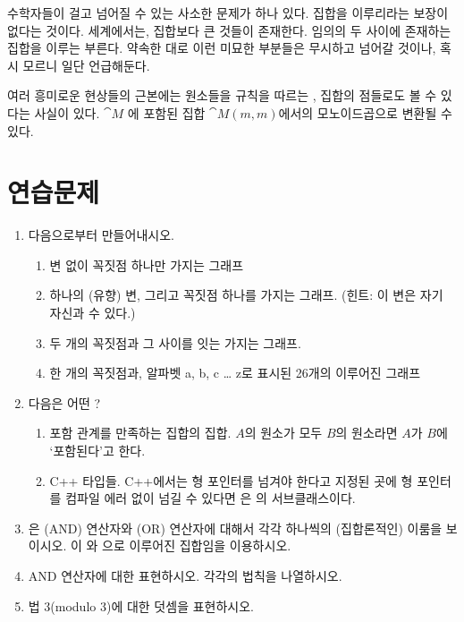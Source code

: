 \noindent
수학자들이 걸고 넘어질 수 있는 사소한 문제가 하나 있다.  집합을 이루리라는 보장이 없다는 것이다.
 세계에서는, 집합보다 큰 것들이 존재한다. 임의의 두 \trObject 사이에 존재하는 \trMorphism\이 집합을 이루는 \trCategory\는  부른다.
약속한 대로 이런 미묘한 부분들은 무시하고 넘어갈 것이나, 혹시 모르니 일단 언급해둔다.

 여러 흥미로운 현상들의 근본에는  원소들을  규칙을 따르는 \trMorphism{}, 집합의 점들로도 볼 수 있다는 사실이 있다.
$\cat{M}$ 에 포함된  \trComposition\은 집합 $\cat{M}(m, m)$에서의 모노이드곱으로 변환될 수 있다.

\section{연습문제}

\begin{enumerate}
\tightlist
\item
  다음으로부터 \trFreeCategory\를 만들어내시오.  

  \begin{enumerate}
  \tightlist
  \item
    변 없이 꼭짓점 하나만 가지는 그래프
  \item
    하나의 (유향) 변, 그리고 꼭짓점 하나를 가지는 그래프.
    (힌트: 이 변은 자기 자신과  수 있다.)
  \item
    두 개의 꼭짓점과 그 사이를 잇는 \trArrow\를 가지는 그래프.
  \item
    한 개의 꼭짓점과, 알파벳 a, b, c \ldots{} z로 표시된 26개의 \trArrow\로 이루어진 그래프
  \end{enumerate}
\item
  다음은 어떤 ?

  \begin{enumerate}
  \tightlist
  \item
    포함 관계를 만족하는 집합의 집합. $A$의 원소가 모두 $B$의 원소라면 $A$가 $B$에 `포함된다'고 한다. %
  \item
    C++ 타입들. C++에서는 형 포인터를 넘겨야 한다고 지정된 곳에 형 포인터를 컴파일 에러 없이 넘길 수 있다면 
    은 의 서브클래스이다.
  \end{enumerate}
\item
  은 \code{\&\&} (AND) 연산자와 \code{||} (OR) 연산자에 대해서 각각 하나씩의 (집합론적인) \trMonoid\를 이룸을 보이시오.
  이 와 으로 이루어진 집합임을 이용하시오.
\item
  AND 연산자에 대한  \trMonoid\를 \trCategory{} 표현하시오.  각각의 \trComposition 법칙을 나열하시오.
\item
  법 3(modulo 3)에 대한 덧셈을 \trMonoid \trCategory\로 표현하시오. %
\end{enumerate}